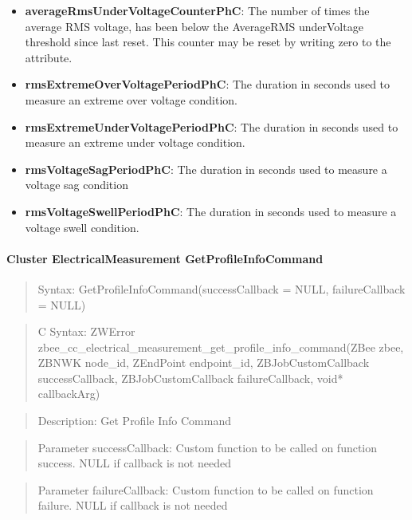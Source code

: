 \begin{itemize}
\item \textbf{averageRmsUnderVoltageCounterPhC}: The number of times the average RMS voltage, has been below the AverageRMS underVoltage threshold since last reset. This counter may be reset by writing zero to the attribute.
\item \textbf{rmsExtremeOverVoltagePeriodPhC}: The duration in seconds used to measure an extreme over voltage condition.
\item \textbf{rmsExtremeUnderVoltagePeriodPhC}: The duration in seconds used to measure an extreme under voltage condition.
\item \textbf{rmsVoltageSagPeriodPhC}: The duration in seconds used to measure a voltage sag condition
\item \textbf{rmsVoltageSwellPeriodPhC}: The duration in seconds used to measure a voltage swell condition.
\end{itemize}

\paragraph{Cluster ElectricalMeasurement GetProfileInfoCommand}
\begin{quote}Syntax: GetProfileInfoCommand(successCallback = NULL, failureCallback = NULL)\end{quote}
\begin{quote}C Syntax: ZWError zbee\_cc\_electrical\_measurement\_get\_profile\_info\_command(ZBee zbee, ZBNWK node\_id, ZEndPoint endpoint\_id, ZBJobCustomCallback successCallback, ZBJobCustomCallback failureCallback, void* callbackArg)\end{quote}
\begin{quote}Description: Get Profile Info Command\end{quote}
\begin{quote}Parameter successCallback: Custom function to be called on function success. NULL if callback is not needed\end{quote}
\begin{quote}Parameter failureCallback: Custom function to be called on function failure. NULL if callback is not needed\end{quote}


